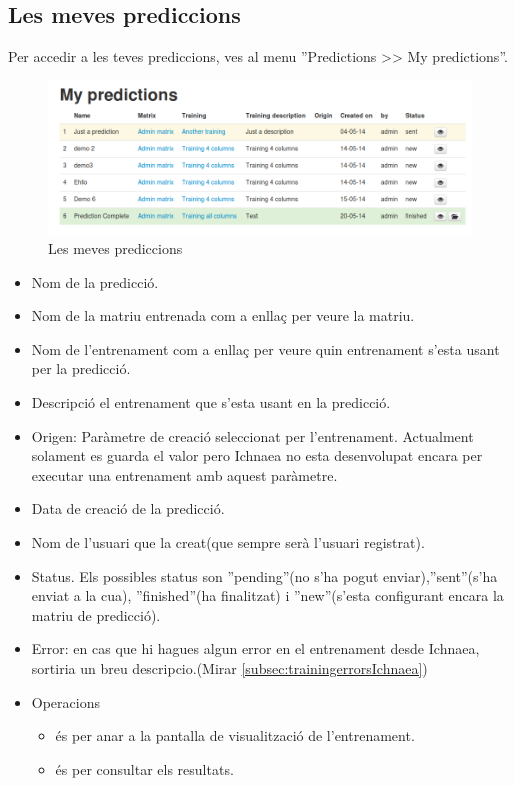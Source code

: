 \subsection{Les meves prediccions}
\label{subsec:myPrediccions}
Per accedir a les teves prediccions, ves al menu ''Predictions >> My predictions''.
\begin{figure}[h!]
  \centering
  \includegraphics[scale=0.4]{img/userguide/my_predictions.png}
  \caption{Les meves prediccions}
  \label{fig:my_predictions}
\end{figure}
\begin{itemize}
\item Nom de la predicció.
\item Nom de la matriu entrenada com a enllaç per veure la matriu.
\item Nom de l'entrenament com a enllaç per veure quin entrenament s'esta usant per la predicció.
\item Descripció el entrenament que s'esta usant en la predicció.
\item Origen: Paràmetre de creació seleccionat per l'entrenament. Actualment solament es guarda el valor pero Ichnaea no esta desenvolupat encara per executar una entrenament amb aquest paràmetre.
\item Data de creaci\'{o} de la predicció.
\item Nom de l'usuari que la creat(que sempre serà l'usuari registrat).
\item Status. Els possibles status son ''pending''(no s'ha pogut enviar),''sent''(s'ha enviat a la cua), ''finished''(ha finalitzat) i ''new''(s'esta configurant encara la matriu de predicció).
\item Error: en cas que hi hagues algun error en el entrenament desde Ichnaea, sortiria un breu descripcio.(Mirar \ref{subsec:trainingerrorsIchnaea})
\item Operacions
 \begin{itemize}
 \item \iconeyeopen \'{e}s per anar a la pantalla de visualització de l'entrenament.
 \item \iconresults \'{e}s per consultar els resultats.
 \end{itemize}
\end{itemize}

